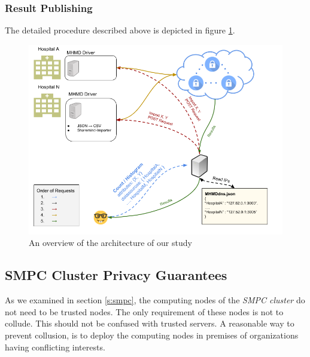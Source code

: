 \subsubsection{Result Publishing}\label{sss:computation-execution}

The detailed procedure described above is depicted in figure \ref{f:overview}.

\begin{figure}[t]
  \centering
  \includegraphics[width=\linewidth]{figures/overview.png}
  \caption{An overview of the architecture of our study }\label{f:overview}
\end{figure}



\subsection{SMPC Cluster Privacy Guarantees}\label{s:smpc-privacy-guarantees}

As we examined in section \ref{s:smpc}, the computing nodes of the \textit{SMPC cluster} do not need to be trusted nodes.
The only requirement of these nodes is not to collude.
This should not be confused with trusted servers.
A reasonable way to prevent collusion, is to deploy the computing nodes in premises of organizations having conflicting interests.


